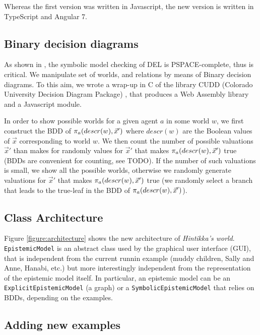 
Whereas the first version was written in Javascript, the new version is written in TypeScript and Angular 7.

\subsection{Binary decision diagrams}

As shown in \cite{DBLP:conf/atal/CharrierS17}, the symbolic model checking of DEL is PSPACE-complete, thus is critical. We manipulate set of worlds, and relations by means of Binary decision diagrams. To this aim, we wrote a wrap-up in C of the library CUDD (Colorado University Decision Diagram Package) \cite{DBLP:journals/sttt/Somenzi01}, that produces a Web Assembly library and a Javascript module.

In order to show possible worlds for a given agent $a$ in some world $w$, we first construct the BDD of $\pi_{a}(descr(w), \vec x')$ where $descr(w)$ are the Boolean values of $\vec x$ corresponding to world $w$. We then count the number of possible valuations $\vec x'$ than makes for randomly values for $\vec x'$ that makes $\pi_{a}(descr(w), \vec x')$ true (BDDs are convenient for counting, see TODO). If the number of such valuations is small, we show all the possible worlds, otherwise we randomly generate valuations for $\vec x'$ that makes $\pi_{a}(descr(w), \vec x')$ true (we randomly select a branch that leads to the true-leaf in the BDD of $\pi_{a}(descr(w), \vec x')$).

\subsection{Class Architecture}

Figure \ref{figure:architecture} shows the new architecture of \emph{Hintikka's world}. \texttt{EpistemicModel} is an abstract class used by the graphical user interface (GUI), that is independent from the current runnin example (muddy children, Sally and Anne, Hanabi, etc.) but more interestingly independent from the representation of the epistemic model itself. In particular, an epistemic model can be an \texttt{ExplicitEpistemicModel} (a graph) or a \texttt{SymbolicEpistemicModel} that relies on BDDs, depending on the examples.


\subsection{Adding new examples}

